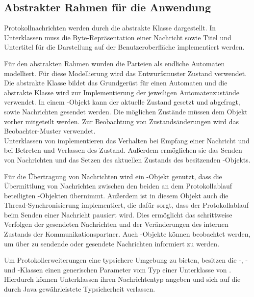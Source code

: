 \subsection{Abstrakter Rahmen für die Anwendung}


Protokollnachrichten werden durch die abstrakte Klasse  dargestellt. In Unterklassen muss die Byte-Repräsentation einer Nachricht sowie Titel und Untertitel für die Darstellung auf der Benutzeroberfläche implementiert werden.

Für den abstrakten Rahmen wurden die Parteien als endliche Automaten modelliert. Für diese Modellierung wird das Entwurfsmuster Zustand  verwendet. \\
Die abstrakte Klasse  bildet das Grundgerüst für einen Automaten und die abstrakte Klasse  wird zur Implementierung der jeweiligen Automatenzustände verwendet. In einem -Objekt kann der aktuelle Zustand gesetzt und abgefragt, sowie Nachrichten gesendet werden. Die möglichen Zustände müssen dem Objekt vorher mitgeteilt werden. Zur Beobachtung von Zustandsänderungen wird das Beobachter-Muster verwendet.   \\
Unterklassen von  implementieren das Verhalten bei Empfang einer Nachricht und bei Betreten und Verlassen des Zustand. Außerdem ermöglichen sie das Senden von Nachrichten und das Setzen des aktuellen Zustands des besitzenden -Objekts.

Für die Übertragung von Nachrichten wird ein -Objekt genutzt, dass die Übermittlung von Nachrichten zwischen den beiden an dem Protokollablauf beteiligten -Objekten übernimmt. Außerdem ist in diesem Objekt auch die Thread-Synchronisierung implementiert, die dafür sorgt, dass der Protokollablauf beim Senden einer Nachricht pausiert wird. Dies ermöglicht das schrittweise Verfolgen der gesendeten Nachrichten und der Veränderungen des internen Zustands der Kommunikationspartner. Auch -Objekte können beobachtet werden, um über zu sendende oder gesendete Nachrichten informiert zu werden.

Um Protokollerweiterungen eine typsichere Umgebung zu bieten, besitzen die -, - und -Klassen einen generischen Parameter vom Typ einer Unterklasse von . Hierdurch können Unterklassen ihren Nachrichtentyp angeben und sich auf die durch Java gewährleistete Typsicherheit verlassen.

